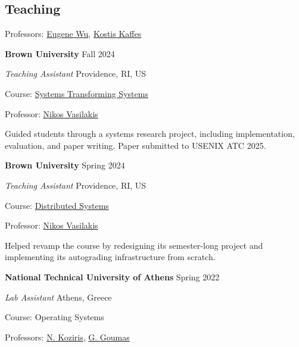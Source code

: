 \documentclass[margin,12pt]{resume}
\newcommand{\descriptionVSpace}{\vspace{0.5ex}\xspace}
\newcommand{\subsectionVSpace}{\vspace{3.5ex}\xspace}
\newcommand{\sectionVSpace}{\vspace{1ex}\xspace} %
\newcommand{\sectionVSpaceCorrection}{\vspace{-3.5ex}} %
\newcommand{\header}[1]{\textbf{#1}\xspace}
\newcommand{\institution}[1]{\header{#1}\xspace}
\newcommand{\place}[1]{#1\xspace}
\newcommand{\role}[1]{\textit{#1}\xspace}
\newcommand{\singleDate}[1]{#1\xspace}
\newcommand{\stitle}[1]{#1:\xspace}
\newenvironment{rSubsection}{}{\par\subsectionVSpace}
\newenvironment{rSection}[1]{\sectionVSpaceCorrection\section{#1}\xspace}{\sectionVSpace\par}
\newenvironment{jobDuties}{\descriptionVSpace}{\par}
\begin{document}
\begin{resume}
\begin{rSection}{Teaching}
\begin{rSubsection}
            \stitle{Professors} \href{https://www.cs.columbia.edu/~ewu/}{Eugene Wu}, \href{https://www.cs.columbia.edu/~kkaffes/index.html}{Kostis Kaffes}
        \end{rSubsection}

        \begin{rSubsection}
            \institution{Brown University} \hfill \singleDate{Fall 2024}

            \role{Teaching Assistant} \hfill \place{Providence, RI, US}

            \stitle{Course} \href{https://cs.brown.edu/courses/csci2952r/}{Systems Transforming Systems}

            \stitle{Professor} \href{https://nikos.vasilak.is}{Nikos Vasilakis}

            \begin{jobDuties}
                Guided students through a systems research project, including implementation, evaluation, and paper writing.
                Paper submitted to USENIX ATC 2025.
            \end{jobDuties}
        \end{rSubsection}

        \begin{rSubsection}
            \institution{Brown University} \hfill \singleDate{Spring 2024}

            \role{Teaching Assistant} \hfill \place{Providence, RI, US}

            \stitle{Course} \href{https://cs.brown.edu/courses/csci1380/s24/}{Distributed Systems}

            \stitle{Professor} \href{https://nikos.vasilak.is}{Nikos Vasilakis}

            \begin{jobDuties}
                Helped revamp the course by redesigning its semester-long project and implementing its autograding infrastructure from scratch.
            \end{jobDuties}
        \end{rSubsection}

        \begin{rSubsection}
            \institution{National Technical University of Athens} \hfill \singleDate{Spring 2022}

            \role{Lab Assistant} \hfill \place{Athens, Greece}

            \stitle{Course} Operating Systems

            \stitle{Professors} \href{http://www.cslab.ntua.gr/~nkoziris/}{N. Koziris}, \href{http://www.cslab.ntua.gr/~goumas/}{G. Goumas}
        \end{rSubsection}


\end{rSection}
\end{resume}
\end{document}
